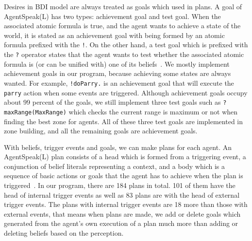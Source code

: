 Desires in BDI model are always treated as goals which used in plans.
A goal of AgentSpeak(L) has two types: achievement goal and test goal.
When the associated atomic formula is true, and the agent wants to achieve a state of the world, it is stated as an achievement goal with being formed by an atomic formula prefixed with the \texttt{!}.
On the other hand, a test goal which is prefixed with the \texttt{?} operator states that the agent wants to test whether the associated atomic formula is (or can be unified with) one of its beliefs~\cite{rafael_BDIAgent_2005}.
We mostly implement achievement goals in our program, because achieving some states are always wanted.
For example, \texttt{!doParry.} is an achievement goal that will execute the \texttt{parry} action when some events are triggered.
Although achievement goals occupy about 99 percent of the goals, we still implement three test goals such as \texttt{?maxRange(MaxRange)} which checks the current range is maximum or not when finding the best zone for agents.
All of these three test goals are implemented in zone building, and all the remaining goals are achievement goals.

With beliefs, trigger events and goals, we can make plans for each agent.
An AgentSpeak(L) plan consists of a head which is formed from a triggering event, a conjunction of belief literals representing a context, and a body which is a sequence of basic actions or goals that the agent has to achieve when the plan is triggered~\cite{rafael_BDIAgent_2005}.
In our program, there are 184 plans in total.
101 of them have the head of internal trigger events as well as 83 plans are with the head of external trigger events.
The plans with internal trigger events are 18 more than those with external events, that means when plans are made, we add or delete goals which generated from the agent's own execution of a plan much more than adding or deleting beliefs based on the perception.

